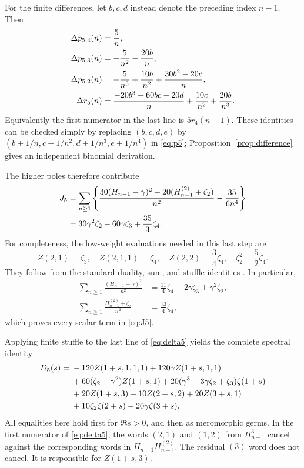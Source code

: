 \documentclass[11pt,a4paper]{article}
\numberwithin{equation}{section}
\theoremstyle{definition}
\theoremstyle{remark}
\begin{document}
For the finite differences, let $b,c,d$ instead denote the preceding
index $n-1$.  Then
\begin{align}
 \Delta p_{5,4}(n)&=\frac5n,\notag\\
 \Delta p_{5,3}(n)&=-\frac5{n^2}-\frac{20b}{n},\notag\\
 \Delta p_{5,2}(n)&=-\frac5{n^3}+\frac{10b}{n^2}
                              +\frac{30b^2-20c}{n},\notag\\
 \Delta r_5(n)&=\frac{-20b^3+60bc-20d}{n}
                          +\frac{10c}{n^2}+\frac{20b}{n^3}.
 \label{eq:delta5}
\end{align}
Equivalently the first numerator in the last line is $5r_4(n-1)$.
These identities can be checked simply by replacing
$(b,c,d,e)$ by $(b+1/n,c+1/n^2,d+1/n^3,e+1/n^4)$ in
\eqref{eq:p5}; Proposition~\ref{prop:difference} gives an independent
binomial derivation.

The higher poles therefore contribute
\begin{align}
 J_5
 &=\sum_{n\ge1}\left\{
       \frac{30(H_{n-1}-\gamma)^2
                    -20(H_{n-1}^{(2)}+\zeta_2)}{n^2}
                            -\frac{35}{6n^4}\right\}\notag\\
 &=30\gamma^2\zeta_2-60\gamma\zeta_3+\frac{35}{3}\zeta_4.
 \label{eq:J5}
\end{align}
For completeness, the low-weight evaluations needed in this last step
are
\[
 Z(2,1)=\zeta_3,\quad Z(2,1,1)=\zeta_4,\quad
 Z(2,2)=\frac34\zeta_4,\quad \zeta_2^2=\frac52\zeta_4.
\]
They follow from the standard duality, sum, and stuffle identities
\cite{DLMF,IKZ}.  In particular,
\begin{align*}
 \sum_{n\ge1}\frac{(H_{n-1}-\gamma)^2}{n^2}
       &=\frac{11}{4}\zeta_4-2\gamma\zeta_3+\gamma^2\zeta_2,\\
 \sum_{n\ge1}\frac{H_{n-1}^{(2)}+\zeta_2}{n^2}
       &=\frac{13}{4}\zeta_4,
\end{align*}
which proves every scalar term in \eqref{eq:J5}.

Applying finite stuffle to the last line of \eqref{eq:delta5} yields
the complete spectral identity
\begin{align}
 D_5(s)={}&-120Z(1+s,1,1,1)+120\gamma Z(1+s,1,1)
 \notag\\
 &+60(\zeta_2-\gamma^2)Z(1+s,1)
       +20(\gamma^3-3\gamma\zeta_2+\zeta_3)\zeta(1+s)
 \notag\\
 &+20Z(1+s,3)+10Z(2+s,2)+20Z(3+s,1)
 \notag\\
 &+10\zeta_2\zeta(2+s)-20\gamma\zeta(3+s).
 \label{eq:D5}
\end{align}
All equalities here hold first for $\Re s>0$, and then as meromorphic
germs.  In the first numerator of \eqref{eq:delta5}, the words
$(2,1)$ and $(1,2)$ from $H_{n-1}^3$ cancel against the corresponding
words in $H_{n-1}H_{n-1}^{(2)}$.  The residual $(3)$ word does not
cancel.  It is responsible for $Z(1+s,3)$.
\end{document}
